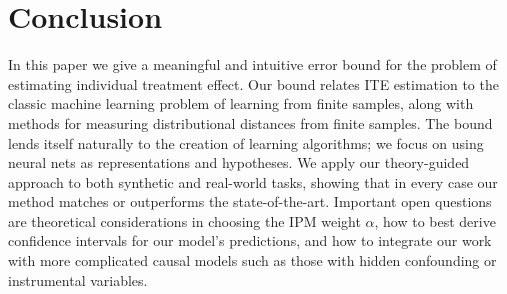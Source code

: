 \vskip -10pt
\section{Conclusion}
In this paper we give a meaningful and intuitive error bound for the problem of estimating individual treatment effect. Our bound relates ITE estimation to the classic machine learning problem of learning from finite samples, along with methods for measuring distributional distances from finite samples. The bound lends itself naturally to the creation of learning algorithms; we focus on using neural nets as representations and hypotheses. We apply our theory-guided approach to both synthetic and real-world tasks, showing that in every case our method matches or outperforms the state-of-the-art. Important open questions are theoretical considerations in choosing the IPM weight $\alpha$, how to best derive confidence intervals for our model's predictions, and how to integrate our work with more complicated causal models such as those with hidden confounding or instrumental variables.%
